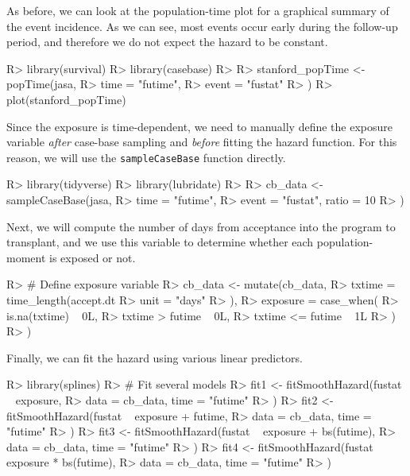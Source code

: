 \documentclass[
]{jss}
\begin{document}
As before, we can look at the population-time plot for a graphical
summary of the event incidence. As we can see, most events occur early
during the follow-up period, and therefore we do not expect the hazard
to be constant.

\begin{CodeChunk}

\begin{CodeInput}
R> library(survival)
R> library(casebase)
R> 
R> stanford_popTime <- popTime(jasa,
R>   time = "futime",
R>   event = "fustat"
R> )
R> plot(stanford_popTime)
\end{CodeInput}
\end{CodeChunk}

Since the exposure is time-dependent, we need to manually define the
exposure variable \emph{after} case-base sampling and \emph{before}
fitting the hazard function. For this reason, we will use the
\texttt{sampleCaseBase} function directly.

\begin{CodeChunk}

\begin{CodeInput}
R> library(tidyverse)
R> library(lubridate)
R> 
R> cb_data <- sampleCaseBase(jasa,
R>   time = "futime",
R>   event = "fustat", ratio = 10
R> )
\end{CodeInput}
\end{CodeChunk}

Next, we will compute the number of days from acceptance into the
program to transplant, and we use this variable to determine whether
each population-moment is exposed or not.

\begin{CodeChunk}

\begin{CodeInput}
R> # Define exposure variable
R> cb_data <- mutate(cb_data,
R>   txtime = time_length(accept.dt %
R>     unit = "days"
R>   ),
R>   exposure = case_when(
R>     is.na(txtime) ~ 0L,
R>     txtime > futime ~ 0L,
R>     txtime <= futime ~ 1L
R>   )
R> )
\end{CodeInput}
\end{CodeChunk}

Finally, we can fit the hazard using various linear predictors.

\begin{CodeChunk}

\begin{CodeInput}
R> library(splines)
R> # Fit several models
R> fit1 <- fitSmoothHazard(fustat ~ exposure,
R>   data = cb_data, time = "futime"
R> )
R> fit2 <- fitSmoothHazard(fustat ~ exposure + futime,
R>   data = cb_data, time = "futime"
R> )
R> fit3 <- fitSmoothHazard(fustat ~ exposure + bs(futime),
R>   data = cb_data, time = "futime"
R> )
R> fit4 <- fitSmoothHazard(fustat ~ exposure * bs(futime),
R>   data = cb_data, time = "futime"
R> )
\end{CodeInput}
\end{CodeChunk}
\end{document}
